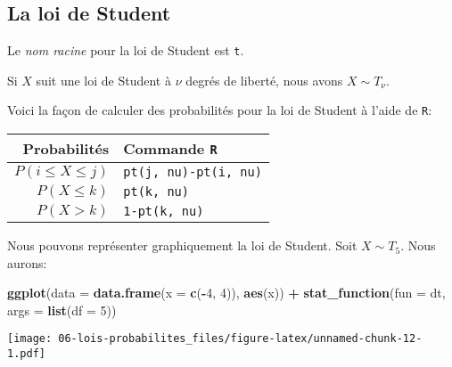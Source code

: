 \documentclass[]{book}
\newenvironment{Shaded}{\begin{snugshade}}{\end{snugshade}}
\newcommand{\KeywordTok}[1]{\textcolor[rgb]{0.13,0.29,0.53}{\textbf{#1}}}
\newcommand{\DataTypeTok}[1]{\textcolor[rgb]{0.13,0.29,0.53}{#1}}
\newcommand{\DecValTok}[1]{\textcolor[rgb]{0.00,0.00,0.81}{#1}}
\newcommand{\StringTok}[1]{\textcolor[rgb]{0.31,0.60,0.02}{#1}}
\newcommand{\OperatorTok}[1]{\textcolor[rgb]{0.81,0.36,0.00}{\textbf{#1}}}
\newcommand{\NormalTok}[1]{#1}
\begin{document}
\subsection{La loi de Student}\label{la-loi-de-student}

Le \emph{nom racine} pour la loi de Student est \texttt{t}.

Si \(X\) suit une loi de Student à \(\nu\) degrés de liberté, nous avons
\(X\sim T_{\nu}\).

Voici la façon de calculer des probabilités pour la loi de Student à
l'aide de \texttt{R}:

\begin{longtable}[]{@{}rl@{}}
\toprule
Probabilités & Commande \texttt{R}\tabularnewline
\midrule
\endhead
\(P(i\leq X \leq j)\) & \texttt{pt(j,\ nu)-pt(i,\ nu)}\tabularnewline
\(P(X\leq k)\) & \texttt{pt(k,\ nu)}\tabularnewline
\(P(X>k)\) & \texttt{1-pt(k,\ nu)}\tabularnewline
\bottomrule
\end{longtable}

Nous pouvons représenter graphiquement la loi de Student. Soit
\(X\sim T_{5}\). Nous aurons:

\begin{Shaded}
\begin{Highlighting}[]
\KeywordTok{ggplot}\NormalTok{(}\DataTypeTok{data =} \KeywordTok{data.frame}\NormalTok{(}\DataTypeTok{x =} \KeywordTok{c}\NormalTok{(}\OperatorTok{-}\DecValTok{4}\NormalTok{, }\DecValTok{4}\NormalTok{)), }\KeywordTok{aes}\NormalTok{(x)) }\OperatorTok{+}
\StringTok{  }\KeywordTok{stat_function}\NormalTok{(}\DataTypeTok{fun =}\NormalTok{ dt, }\DataTypeTok{args =} \KeywordTok{list}\NormalTok{(}\DataTypeTok{df =} \DecValTok{5}\NormalTok{))}
\end{Highlighting}
\end{Shaded}

\texttt{[image: 06-lois-probabilites\_files/figure-latex/unnamed-chunk-12-1.pdf]}


\end{document}
